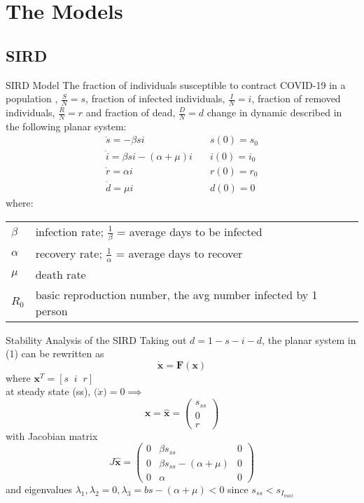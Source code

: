 \documentclass{beamer}
\makeatletter
\newenvironment{conditions}
  {\par\vspace{\abovedisplayskip}\noindent\begin{tabular}{>{$}l<{$} @{${}={}$} l}}
  {\end{tabular}\par\vspace{\belowdisplayskip}}
\makeatother
\begin{document}
\section{The Models}
\subsection{SIRD}
\begin{frame}{SIRD Model}
The fraction of individuals susceptible to contract COVID-19 in a population , $\frac{S}{N} = s$, fraction of infected individuals, $\frac{I}{N} = i$, fraction of removed individuals, $\frac{R}{N} = r$ and fraction of dead, $\frac{D}{N} = d$ change in dynamic described in the following planar system: 
\begin{equation}
       \begin{array}{ll}
      \dot{s} = - \beta s i  & \quad s(0) = s_0 \\
       \dot{i} = \beta s i - (\alpha + \mu)i & \quad i(0) = i_0 \\
       \dot{r} = \alpha i  & \quad r(0) = r_0 \\ 
       \dot{d} = \mu i & \quad d(0) = 0 
        \end{array}
\end{equation}
where:
\begin{conditions}
\beta & infection rate; \quad \quad $\frac{1}{\beta}$ = average days to be infected \\
\alpha & recovery rate; \quad \quad $\frac{1}{\alpha}$ = average days to recover \\
\mu & death rate \\
R_0 & basic reproduction number, the avg number infected by 1 person \\
\end{conditions}
\end{frame}

\begin{frame}{Stability Analysis of the SIRD}
	Taking out $d = 1 - s - i - d $, the planar system in (1) can be rewritten as $$\mathbf{\dot{x}} = \mathbf{F}(\mathbf{x})$$ 
	where $\mathbf{x}^{T} = [s \;\;i\;\; r]$ \\
	at steady state (ss), $\mathbf(\dot{x}) = 0 \implies $ $$\mathbf{x} = \hat{\mathbf{x}} = \begin{pmatrix} s_{ss} \\ 0 \\ r \end{pmatrix}$$ 
	with Jacobian matrix $$J{\mathbf{\hat{x}}} = \begin{pmatrix} 0 & \beta s_{ss} & 0\\ 0 & \beta s_{ss} - (\alpha + \mu) & 0 \\ 0 & \alpha & 0  \end{pmatrix} $$ and eigenvalues $\lambda_1, \lambda_2 = 0, \lambda_3 = bs - (\alpha + \mu) <0 $ since $s_{ss} < s_{I_{max}}$
	
\end{frame}
\end{document}

